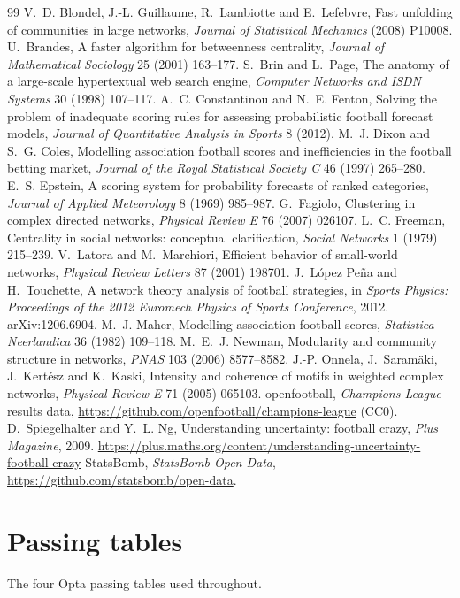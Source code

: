 \documentclass[11pt,a4paper]{article}
\begin{document}
\begin{thebibliography}{99}\small
{} V.~D. Blondel, J.-L. Guillaume, R.~Lambiotte and E.~Lefebvre, Fast unfolding of communities in large networks, \emph{Journal of Statistical Mechanics} (2008) P10008.
 U.~Brandes, A faster algorithm for betweenness centrality, \emph{Journal of Mathematical Sociology} 25 (2001) 163--177.
 S.~Brin and L.~Page, The anatomy of a large-scale hypertextual web search engine, \emph{Computer Networks and ISDN Systems} 30 (1998) 107--117.
 A.~C. Constantinou and N.~E. Fenton, Solving the problem of inadequate scoring rules for assessing probabilistic football forecast models, \emph{Journal of Quantitative Analysis in Sports} 8 (2012).
 M.~J. Dixon and S.~G. Coles, Modelling association football scores and inefficiencies in the football betting market, \emph{Journal of the Royal Statistical Society C} 46 (1997) 265--280.
 E.~S. Epstein, A scoring system for probability forecasts of ranked categories, \emph{Journal of Applied Meteorology} 8 (1969) 985--987.
 G.~Fagiolo, Clustering in complex directed networks, \emph{Physical Review E} 76 (2007) 026107.
 L.~C. Freeman, Centrality in social networks: conceptual clarification, \emph{Social Networks} 1 (1979) 215--239.
 V.~Latora and M.~Marchiori, Efficient behavior of small-world networks, \emph{Physical Review Letters} 87 (2001) 198701.
 J.~L\'opez Pe\~na and H.~Touchette, A network theory analysis of football strategies, in \emph{Sports Physics: Proceedings of the 2012 Euromech Physics of Sports Conference}, 2012. arXiv:1206.6904.
 M.~J. Maher, Modelling association football scores, \emph{Statistica Neerlandica} 36 (1982) 109--118.
 M.~E.~J. Newman, Modularity and community structure in networks, \emph{PNAS} 103 (2006) 8577--8582.
 J.-P. Onnela, J.~Saram\"aki, J.~Kert\'esz and K.~Kaski, Intensity and coherence of motifs in weighted complex networks, \emph{Physical Review E} 71 (2005) 065103.
 openfootball, \emph{Champions League} results data, \url{https://github.com/openfootball/champions-league} (CC0).
 D.~Spiegelhalter and Y.~L. Ng, Understanding uncertainty: football crazy, \emph{Plus Magazine}, 2009. \url{https://plus.maths.org/content/understanding-uncertainty-football-crazy}
 StatsBomb, \emph{StatsBomb Open Data}, \url{https://github.com/statsbomb/open-data}.
\end{thebibliography}

\appendix
\section{Passing tables}\label{app:matrices}
The four Opta passing tables used throughout.


\end{document}
